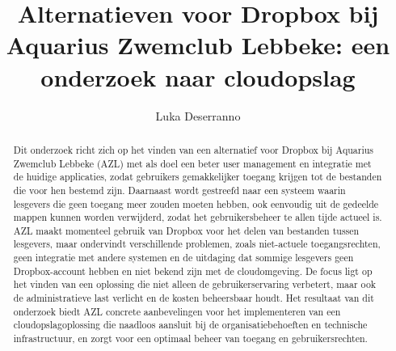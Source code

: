 \documentclass{hogent-article}
\title{Alternatieven voor Dropbox bij Aquarius Zwemclub Lebbeke: een onderzoek naar cloudopslag}
\author{Luka Deserranno}
\begin{document}
\begin{abstract}
  Dit onderzoek richt zich op het vinden van een alternatief voor Dropbox bij Aquarius Zwemclub Lebbeke (AZL) met als doel een beter user management en integratie met de huidige applicaties, zodat gebruikers gemakkelijker toegang krijgen tot de bestanden die voor hen bestemd zijn. Daarnaast wordt gestreefd naar een systeem waarin lesgevers die geen toegang meer zouden moeten hebben, ook eenvoudig uit de gedeelde mappen kunnen worden verwijderd, zodat het gebruikersbeheer te allen tijde actueel is.
  AZL maakt momenteel gebruik van Dropbox voor het delen van bestanden tussen lesgevers, maar ondervindt verschillende problemen, zoals niet-actuele toegangsrechten, geen integratie met andere systemen en de uitdaging dat sommige lesgevers geen Dropbox-account hebben en niet bekend zijn met de cloudomgeving.
  De focus ligt op het vinden van een oplossing die niet alleen de gebruikerservaring verbetert, maar ook de administratieve last verlicht en de kosten beheersbaar houdt. 
  Het resultaat van dit onderzoek biedt AZL concrete aanbevelingen voor het implementeren van een cloudopslagoplossing die naadloos aansluit bij de organisatiebehoeften en technische infrastructuur, en zorgt voor een optimaal beheer van toegang en gebruikersrechten.
\end{abstract}

\tableofcontents



\printbibliography[heading=bibintoc]
\end{document}
